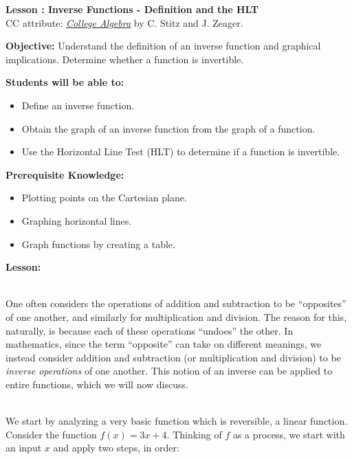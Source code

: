 \documentclass[12pt]{article}
\theoremstyle{definition}
\begin{document}
{\bf \large Lesson : Inverse Functions - Definition and the HLT}\label{les:inverse_functions_definition_and_HLT}
\\ CC attribute: \href{http://www.stitz-zeager.com}{\it{College Algebra}} by C. Stitz and J. Zeager. 
\hfill \doclicenseImage[imagewidth=5em]\\
\par
{\bf Objective:} 	Understand the definition of an inverse function and graphical implications.  Determine whether a function is invertible.\\  
\par
{\bf Students will be able to:}
\begin{itemize}
	\item Define an inverse function.
	\item Obtain the graph of an inverse function from the graph of a function.
	\item Use the Horizontal Line Test (HLT) to determine if a function is invertible.
\end{itemize}
{\bf Prerequisite Knowledge:}
\begin{itemize}
	\item Plotting points on the Cartesian plane.
	\item Graphing horizontal lines.
	\item Graph functions by creating a table.
\end{itemize}
\hrulefill

{\bf Lesson:}\\
\ \par
One often considers the operations of addition and subtraction to be ``opposites'' of one another, and similarly for multiplication and division.  The reason for this, naturally, is because each of these operations ``undoes'' the other.  In mathematics, since the term ``opposite'' can take on different meanings, we instead consider addition and subtraction (or multiplication and division) to be {\it inverse operations} of one another.  This notion of an inverse can be applied to entire functions, which we will now discuss.\\
\ \par
We start by analyzing a very basic function which is reversible, a linear function.  Consider the function $f(x) = 3x+4$.  Thinking of $f$ as a process, we start with an input $x$ and apply two steps, in order: 
\end{document}
